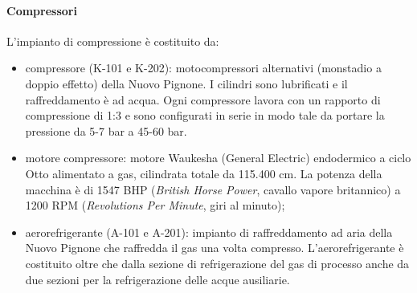 \paragraph{Compressori}
L'impianto di compressione è costituito da:
\begin{itemize}
	\item compressore (K-101 e K-202): motocompressori alternativi (monstadio a doppio effetto) della Nuovo Pignone. I cilindri sono lubrificati e il raffreddamento è ad acqua. Ogni compressore lavora con un rapporto di compressione di 1:3 e sono configurati in serie in modo tale da portare la pressione da 5-7 bar a 45-60 bar.
	\item motore compressore: motore Waukesha (General Electric) endodermico a ciclo Otto alimentato a gas, cilindrata totale da 115.400 cm. La potenza della macchina è di 1547 BHP (\textit{British Horse Power}, cavallo vapore britannico) a 1200 RPM (\textit{Revolutions Per Minute}, giri al minuto);
	\item aerorefrigerante (A-101 e A-201): impianto di raffreddamento ad aria della Nuovo Pignone che raffredda il gas una volta compresso. L'aerorefrigerante è costituito oltre che dalla sezione di refrigerazione del gas di processo anche da due sezioni per la refrigerazione delle acque ausiliarie.
\end {itemize}

